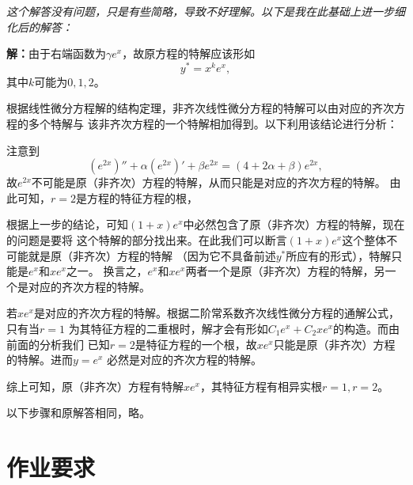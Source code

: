 	\begin{center}
	\end{center}
	
	{\it 这个解答没有问题，只是有些简略，导致不好理解。以下是我在此基础上进一步细化后的解答：}
	
	{\bf 解：}由于右端函数为$\gamma e^x$，故原方程的特解应该形如
	$$y^*=x^ke^x,$$
	其中$k$可能为$0,1,2$。
	
	根据线性微分方程解的结构定理，非齐次线性微分方程的特解可以由对应的齐次方程的多个特解与
	该非齐次方程的一个特解相加得到。以下利用该结论进行分析：
	
	注意到
	$$(e^{2x})''+\alpha(e^{2x})'+\beta e^{2x}
	=(4+2\alpha+\beta)e^{2x},$$
	故$e^{2x}$不可能是原（非齐次）方程的特解，从而只能是对应的齐次方程的特解。
	由此可知，$r=2$是方程的特征方程的根，
	
	根据上一步的结论，可知$(1+x)e^x$中必然包含了原（非齐次）方程的特解，现在的问题是要将
	这个特解的部分找出来。在此我们可以断言$(1+x)e^x$这个整体不可能就是原（非齐次）方程的特解
	（因为它不具备前述$y^*$所应有的形式），特解只能是$e^x$和$xe^x$之一。
	换言之，$e^x$和$xe^x$两者一个是原（非齐次）方程的特解，另一个是对应的齐次方程的特解。
	
	若$xe^x$是对应的齐次方程的特解。根据二阶常系数齐次线性微分方程的通解公式，只有当$r=1$
	为其特征方程的二重根时，解才会有形如$C_1e^x+C_2xe^x$的构造。而由前面的分析我们
	已知$r=2$是特征方程的一个根，故$xe^x$只能是原（非齐次）方程的特解。进而$y=e^x$
	必然是对应的齐次方程的特解。
	
	综上可知，原（非齐次）方程有特解$xe^x$，其特征方程有相异实根$r=1,r=2$。
	
	以下步骤和原解答相同，略。
	
	\newpage
	
	\section*{作业要求}
	
